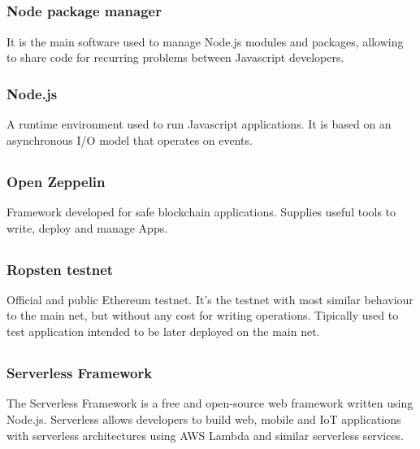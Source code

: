	\subsection*{}
		\subsubsection*{Node package manager}
			It is the main software used to manage Node.js modules and packages, allowing to share code for recurring problems between Javascript developers.
		\subsubsection*{Node.js}
			A runtime environment used to run Javascript applications. It is based on an asynchronous I/O model that operates on events.
	
	\subsection*{}
		\subsubsection*{Open Zeppelin}
			Framework developed for safe blockchain applications. Supplies useful tools to write, deploy and manage \DJ{}Apps.
      
	\subsection*{}
		\subsubsection*{Ropsten testnet}
			Official and public Ethereum testnet. It's the testnet with most similar behaviour to the main net, but without any cost for writing operations. Tipically used to test application intended to be later deployed on the main net.
      
	\subsection*{}
		\subsubsection*{Serverless Framework}
			The Serverless Framework is a free and open-source web framework written using Node.js. Serverless allows developers to build web, mobile and IoT applications with serverless architectures using AWS Lambda and similar serverless services.
